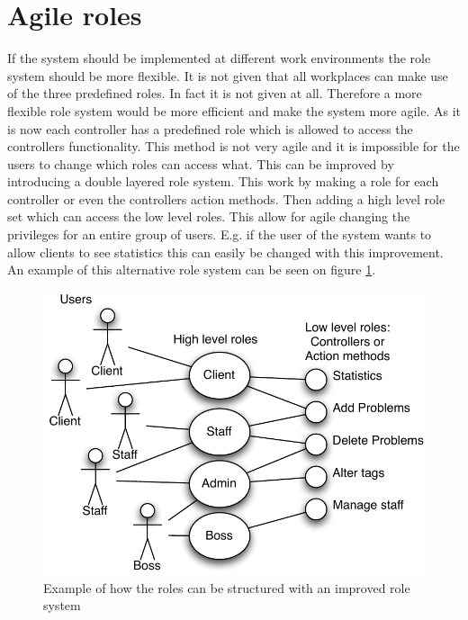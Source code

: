 \section{Agile roles}
\label{sec:agile_roles}
If the system should be implemented at different work environments the role system should be more flexible. 
It is not given that all workplaces can make use of the three predefined roles. 
In fact it is not given at all. 
Therefore a more flexible role system would be more efficient and make the system more agile. 
As it is now each controller has a predefined role which is allowed to access the controllers functionality. 
This method is not very agile and it is impossible for the users to change which roles can access what. 
This can be improved by introducing a double layered role system.  
This work by making a role for each controller or even the controllers action methods. 
Then adding a high level role set which can access the low level roles. 
This allow for agile changing the privileges for an entire group of users. 
E.g. if the user of the system wants to allow clients to see statistics this can easily be changed with this improvement. An example of this alternative role system can be seen on figure \ref{fig:improved_role_system}.


\begin{figure}
\begin{center}
\includegraphics[scale=1]{input/epilogue/improvements/improved_role_system.pdf}
\caption{Example of how the roles can be structured with an improved role system}
\label{fig:improved_role_system}
\end{center}
\end{figure}
